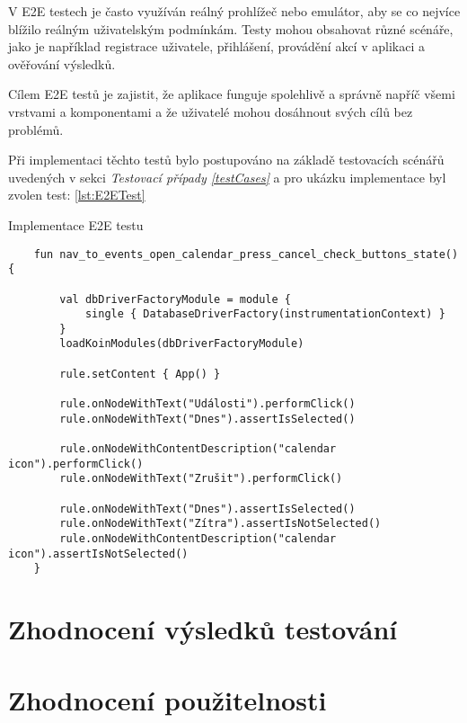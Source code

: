 V E2E testech je často využíván reálný prohlížeč nebo emulátor, aby se co nejvíce blížilo reálným uživatelským podmínkám. Testy mohou obsahovat různé 
scénáře, jako je například registrace uživatele, přihlášení, provádění akcí v aplikaci a ověřování výsledků.

Cílem E2E testů je zajistit, že aplikace funguje spolehlivě a správně napříč všemi vrstvami a komponentami a že uživatelé mohou dosáhnout svých cílů
 bez problémů.

Při implementaci těchto testů bylo postupováno na základě testovacích scénářů uvedených v sekci \textit{Testovací případy \ref{testCases}} a pro
ukázku implementace byl zvolen test: \ref{lst:E2ETest}

\begin{listing}[H]
  \caption{Implementace E2E testu}\label{lst:E2ETest}
  \begin{verbatim}
    fun nav_to_events_open_calendar_press_cancel_check_buttons_state() {

        val dbDriverFactoryModule = module {
            single { DatabaseDriverFactory(instrumentationContext) }
        }
        loadKoinModules(dbDriverFactoryModule)

        rule.setContent { App() }

        rule.onNodeWithText("Události").performClick()
        rule.onNodeWithText("Dnes").assertIsSelected()

        rule.onNodeWithContentDescription("calendar icon").performClick()
        rule.onNodeWithText("Zrušit").performClick()

        rule.onNodeWithText("Dnes").assertIsSelected()
        rule.onNodeWithText("Zítra").assertIsNotSelected()
        rule.onNodeWithContentDescription("calendar icon").assertIsNotSelected()
    }
\end{verbatim}
\end{listing}

\section{Zhodnocení výsledků testování}

\section{Zhodnocení použitelnosti}

